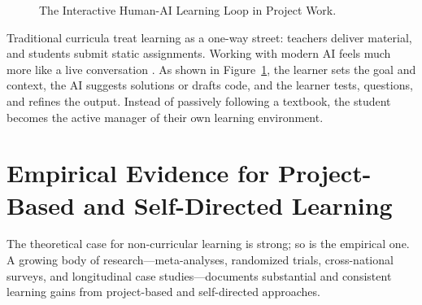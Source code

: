 \documentclass[11pt]{article}
\newif\ifhasticz
\begin{document}
\begin{figure}[htbp]
\centering
\ifhasticz
\begin{tikzpicture}[x=1cm,y=1cm,>=Latex]
  \tikzset{block/.style={draw,thick,rounded corners=4pt,fill=gray!10,align=center,font=\small,inner sep=6pt}}
  \tikzset{arr/.style={->,thick}}
  
  \node[block,text width=3.6cm] (intent) at (0,0) {\textbf{Learner Intent \& Framing}\\[2pt]\footnotesize Defining goals, breaking down tasks, setting constraints};
  \node[block,text width=3.6cm] (exec) at (6.5,0) {\textbf{AI Assistance \& Generation}\\[2pt]\footnotesize Drafting code, suggesting approaches, answering questions};
  \node[block,text width=4.0cm] (verify) at (3.25,-2.2) {\textbf{Human Verification \& Critique}\\[2pt]\footnotesize Testing the output, finding errors, reflecting on results};

  \draw[arr] (intent) -- node[above,font=\footnotesize] {Specification} (exec);
  \draw[arr] (exec) |- node[right,font=\footnotesize] {Generated Output} (verify);
  \draw[arr] (verify) -| node[left,font=\footnotesize] {Refined Direction} (intent);
\end{tikzpicture}
\fi
\caption{The Interactive Human-AI Learning Loop in Project Work.}
\label{fig:bidirectional_loop}
\end{figure}

Traditional curricula treat learning as a one-way street: teachers deliver material, and students submit static assignments. Working with modern AI feels much more like a live conversation \citep{zheng2024}. As shown in Figure~\ref{fig:bidirectional_loop}, the learner sets the goal and context, the AI suggests solutions or drafts code, and the learner tests, questions, and refines the output. Instead of passively following a textbook, the student becomes the active manager of their own learning environment.

\section{Empirical Evidence for Project-Based and Self-Directed Learning}

The theoretical case for non-curricular learning is strong; so is the empirical one. A growing body of research---meta-analyses, randomized trials, cross-national surveys, and longitudinal case studies---documents substantial and consistent learning gains from project-based and self-directed approaches.
\end{document}
